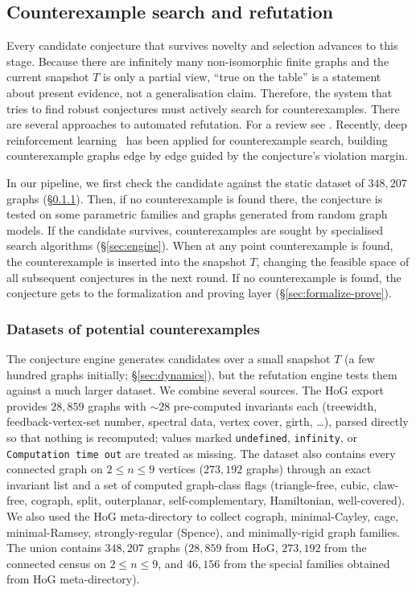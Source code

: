 \documentclass[]{ceurart}
\begin{document}
\subsection{Counterexample search and refutation}
\label{sec:refute}
Every candidate conjecture that survives novelty and selection advances to this stage.
Because there are infinitely many non-isomorphic finite graphs and the current snapshot $T$ is only a partial view,
``true on the table'' is a statement about present evidence, not a
generalisation claim. Therefore, the system that tries to find robust conjectures must actively search for counterexamples. There are several approaches to automated refutation. For a review see \cite{jooken2025computer}. Recently, deep reinforcement learning~\cite{wagner2021constructions} has been applied for counterexample search, building counterexample graphs edge by edge guided by the conjecture's violation margin.

In our pipeline, we first check the candidate against the static dataset of $348{,}207$ graphs (\S\ref{sec:data}). Then, if no counterexample is found there, the conjecture is tested on some parametric families and graphs generated from random graph models. If the candidate survives, counterexamples are sought by 
specialised search algorithms (\S\ref{sec:engine}). When at any point counterexample is found, the counterexample is inserted into the snapshot $T$, changing the feasible
space of all subsequent conjectures in the next round. If no counterexample is found, the conjecture gets to the formalization and proving layer (\S\ref{sec:formalize-prove}).

\subsubsection{Datasets of potential counterexamples}
\label{sec:data}

The conjecture engine generates candidates over a small snapshot $T$ (a few hundred graphs initially; \S\ref{sec:dynamics}), but the refutation engine tests them against a much larger dataset. We combine
several sources. The HoG export~\cite{goedgebeur2022introduction,coolsaet2023house} provides $28{,}859$ graphs with $\sim\!28$
pre-computed invariants each (treewidth, feedback-vertex-set number, spectral
data, vertex cover, girth, \dots), parsed directly so that nothing is
recomputed; values marked \texttt{undefined}, \texttt{infinity}, or
\texttt{Computation time out} are treated as missing. The dataset also contains every connected graph on $2\le n\le 9$ vertices ($273{,}192$ graphs)
through an exact invariant list and a set of computed graph-class flags
(triangle-free, cubic, claw-free, cograph, split, outerplanar,
self-complementary, Hamiltonian, well-covered). We also used the HoG meta-directory to collect cograph, minimal-Cayley, cage,
minimal-Ramsey, strongly-regular (Spence), and minimally-rigid graph families. The
union contains $348{,}207$ graphs ($28{,}859$ from HoG, $273{,}192$ from the connected census on
$2\le n\le 9$, and $46{,}156$ from the special families obtained from HoG meta-directory). 
\end{document}
